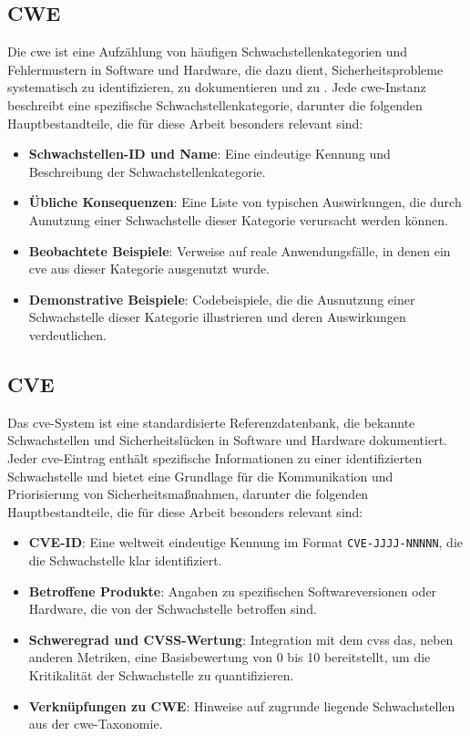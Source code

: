 \subsection{CWE}
\label{bg:cwe}
Die \gls{cwe} ist eine Aufzählung von häufigen Schwachstellenkategorien und Fehlermustern in Software und Hardware, die dazu dient, Sicherheitsprobleme systematisch zu identifizieren, zu dokumentieren und zu \autocite{CWEWebsite}. Jede \gls{cwe}-Instanz beschreibt eine spezifische Schwachstellenkategorie, darunter die folgenden Hauptbestandteile, die für diese Arbeit besonders relevant sind:

\begin{itemize}
    \item \textbf{Schwachstellen-ID und Name}: Eine eindeutige Kennung und Beschreibung der Schwachstellenkategorie.
    \item \textbf{Übliche Konsequenzen}: Eine Liste von typischen Auswirkungen, die durch Aunutzung einer Schwachstelle dieser Kategorie verursacht werden können.
    \item \textbf{Beobachtete Beispiele}: Verweise auf reale Anwendungsfälle, in denen ein \gls{cve} aus dieser Kategorie ausgenutzt wurde.
    \item \textbf{Demonstrative Beispiele}: Codebeispiele, die die Ausnutzung einer Schwachstelle dieser Kategorie illustrieren und deren Auswirkungen verdeutlichen.
\end{itemize}

\subsection{CVE}
\label{bg:cve}
Das \gls{cve}-System ist eine standardisierte Referenzdatenbank, die bekannte Schwachstellen und Sicherheitslücken in Software und Hardware dokumentiert. Jeder \gls{cve}-Eintrag enthält spezifische Informationen zu einer identifizierten Schwachstelle und bietet eine Grundlage für die Kommunikation und Priorisierung von Sicherheitsmaßnahmen, darunter die folgenden Hauptbestandteile, die für diese Arbeit besonders relevant sind:

\begin{itemize}
    \item \textbf{CVE-ID}: Eine weltweit eindeutige Kennung im Format \texttt{CVE-JJJJ-NNNNN}, die die Schwachstelle klar identifiziert.
    \item \textbf{Betroffene Produkte}: Angaben zu spezifischen Softwareversionen oder Hardware, die von der Schwachstelle betroffen sind.
    \item \textbf{Schweregrad und CVSS-Wertung}: Integration mit dem \gls{cvss} das, neben anderen Metriken, eine Basisbewertung von 0 bis 10 bereitstellt, um die Kritikalität der Schwachstelle zu quantifizieren.
    \item \textbf{Verknüpfungen zu CWE}: Hinweise auf zugrunde liegende Schwachstellen aus der \gls{cwe}-Taxonomie.
\end{itemize}

